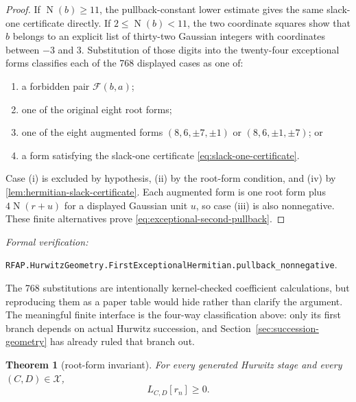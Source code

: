 \documentclass[11pt]{article}
\newtheorem{theorem}{Theorem}[section]
\newcommand{\Norm}[1]{\operatorname{N}\!\left(#1\right)}
\newcommand{\leanref}[1]{\par\smallskip\noindent
  \emph{Formal verification:}\par\nobreak
  {\raggedright\nolinkurl{#1}.\par}}
\begin{document}
\begin{proof}
If $\Norm b\ge11$, the pullback-constant lower estimate gives the same
slack-one certificate directly.  If $2\le\Norm b<11$, the two coordinate
squares show that $b$ belongs to an explicit list of thirty-two Gaussian
integers with coordinates between $-3$ and $3$.  Substitution of those
digits into the twenty-four exceptional forms classifies each of the 768
displayed cases as one of:
\begin{enumerate}[label=(\roman*)]
\item a forbidden pair $\mathcal F(b,a)$;
\item one of the original eight root forms;
\item one of the eight augmented forms
$(8,6,\pm7,\pm1)$ or $(8,6,\pm1,\pm7)$; or
\item a form satisfying the slack-one certificate
\eqref{eq:slack-one-certificate}.
\end{enumerate}
Case (i) is excluded by hypothesis, (ii) by the root-form condition, and
(iv) by \cref{lem:hermitian-slack-certificate}.  Each augmented form is one
root form plus $4\Norm{r+u}$ for a displayed Gaussian unit $u$, so case (iii)
is also nonnegative.  These finite alternatives prove
\eqref{eq:exceptional-second-pullback}.
\end{proof}

\leanref{RFAP.HurwitzGeometry.FirstExceptionalHermitian.pullback_nonnegative}

The 768 substitutions are intentionally kernel-checked coefficient
calculations, but reproducing them as a paper table would hide rather than
clarify the argument.  The meaningful finite interface is the four-way
classification above: only its first branch depends on actual Hurwitz
succession, and Section~\ref{sec:succession-geometry} has already ruled that
branch out.

\begin{theorem}[root-form invariant]
\label{thm:root-form-invariant}
For every generated Hurwitz stage and every $(C,D)\in\mathcal X$,
\begin{equation}
\label{eq:root-form-invariant}
                              L_{C,D}[r_n]\ge0.
\end{equation}
\end{theorem}
\end{document}
